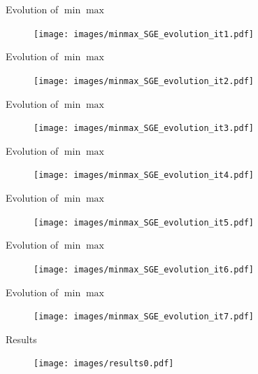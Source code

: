 \documentclass[10pt]{beamer}
\begin{document}
\begin{frame}{Evolution of $\min\max$}
    \begin{figure}
        \texttt{[image: images/minmax\_SGE\_evolution\_it1.pdf]}
    \end{figure}
\end{frame}


\begin{frame}{Evolution of $\min\max$}
    \begin{figure}
        \texttt{[image: images/minmax\_SGE\_evolution\_it2.pdf]}
    \end{figure}
\end{frame}


\begin{frame}{Evolution of $\min\max$}
    \begin{figure}
        \texttt{[image: images/minmax\_SGE\_evolution\_it3.pdf]}
    \end{figure}
\end{frame}


\begin{frame}{Evolution of $\min\max$}
    \begin{figure}
        \texttt{[image: images/minmax\_SGE\_evolution\_it4.pdf]}
    \end{figure}
\end{frame}


\begin{frame}{Evolution of $\min\max$}
    \begin{figure}
        \texttt{[image: images/minmax\_SGE\_evolution\_it5.pdf]}
    \end{figure}
\end{frame}


\begin{frame}{Evolution of $\min\max$}
    \begin{figure}
        \texttt{[image: images/minmax\_SGE\_evolution\_it6.pdf]}
    \end{figure}
\end{frame}


\begin{frame}{Evolution of $\min\max$}
    \begin{figure}
        \texttt{[image: images/minmax\_SGE\_evolution\_it7.pdf]}
    \end{figure}
\end{frame}


\begin{frame}{Results}
    \begin{figure}
        \texttt{[image: images/results0.pdf]}
    \end{figure}
\end{frame}
\end{document}
